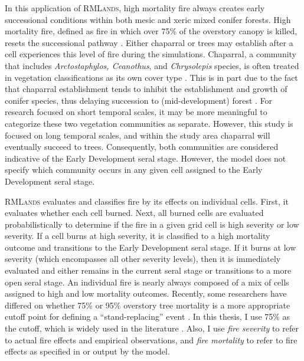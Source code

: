 In this application of \textsc{RMLands}, high mortality fire always creates early successional conditions within both mesic and xeric mixed conifer forests. High mortality fire, defined as fire in which over 75\% of the overstory canopy is killed, resets the successional pathway \citep{Agee1993}. Either chaparral or trees may establish after a cell experiences this level of fire during the simulations. Chaparral, a community that includes \emph{Arctostaphylos, Ceanothus}, and \emph{Chrysolepis} species, is often treated in vegetation classifications as its own cover type \citep{USDAForestService2008,VandeWater2011}. This is in part due to the fact that chaparral establishment tends to inhibit the establishment and growth of conifer species, thus delaying succession to (mid-development) forest \citep{Landfire2007}. For research focused on short temporal scales, it may be more meaningful to categorize these two vegetation communities as separate. However, this study is focused on long temporal scales, and within the study area chaparral will eventually succeed to trees. Consequently, both communities are considered indicative of the Early Development seral stage. However, the model does not specify which community occurs in any given cell assigned to the Early Development seral stage.

\textsc{RMLands} evaluates and classifies fire by its effects on individual cells. First, it evaluates whether each cell burned. Next, all burned cells are evaluated probabilistically to determine if the fire in a given grid cell is high severity or low severity. If a cell burns at high severity, it is classified to a high mortality outcome and transitions to the Early Development seral stage. If it burns at low severity (which encompasses all other severity levels), then it is immediately evaluated and either remains in the current seral stage or transitions to a more open seral stage. An individual fire is nearly always composed of a mix of cells assigned to high and low mortality outcomes. Recently, some researchers have differed on whether 75\% or 95\% overstory tree mortality is a more appropriate cutoff point for defining a ``stand-replacing'' event \citep{Mallek2013,Fule2014}. In this thesis, I use 75\% as the cutoff, which is widely used in the literature \citep{Agee1993,Agee2007,Miller2009,Baker2014}. Also, I use \emph{fire severity} to refer to actual fire effects and empirical observations, and \emph{fire mortality} to refer to fire effects as specified in or output by the model.

